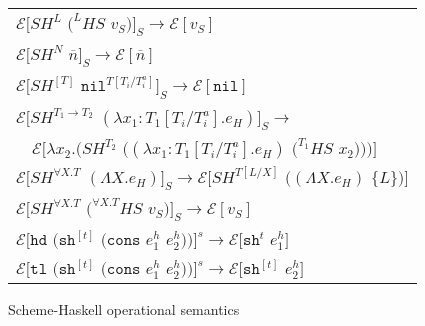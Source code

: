 \begin{figure}[p]
\centering
\begin{tabular}{l}
$\mathscr{E}[SH^{L}$ $(^{L}HS$ $v_{S})]_{S}\rightarrow\mathscr{E}[v_{S}]$ \\
$\mathscr{E}[SH^{N}$ $\overline{n}]_{S}\rightarrow\mathscr{E}[\overline{n}]$ \\
$\mathscr{E}[SH^{[T]}$ $\mathtt{nil}^{T[T_{i}/T_{i}^{a}]}]_{S}\rightarrow\mathscr{E}[\mathtt{nil}]$ \\
$\mathscr{E}[SH^{T_{1}\rightarrow T_{2}}$ $(\lambda x_{1}:T_{1}[T_{i}/T_{i}^{a}].e_{H})]_{S}\rightarrow$ \\
$\quad\mathscr{E}[\lambda x_{2}.(SH^{T_{2}}$ $((\lambda x_{1}:T_{1}[T_{i}/T_{i}^{a}].e_{H})$ $(^{T_{1}}HS$ $x_{2})))]$ \\
$\mathscr{E}[SH^{\forall X.T}$ $(\Lambda X.e_{H})]_{S}\rightarrow\mathscr{E}[SH^{T[L/X]}$ $((\Lambda X.e_{H})$ $\lbrace L\rbrace)]$ \\
$\mathscr{E}[SH^{\forall X.T}$ $(^{\forall X.T}HS$ $v_{S})]_{S}\rightarrow\mathscr{E}[v_{S}]$ \\

$\mathscr{E}[\mathtt{hd}$ $(\mathtt{sh}^{[t]}$ $(\mathtt{cons}$ $e^h_1$ $e^h_2))]^s\rightarrow\mathscr{E}[\mathtt{sh}^{t}$ $e^h_1]$ \\

$\mathscr{E}[\mathtt{tl}$ $(\mathtt{sh}^{[t]}$ $(\mathtt{cons}$ $e^h_1$ $e^h_2))]^s\rightarrow\mathscr{E}[\mathtt{sh}^{[t]}$ $e^h_2]$ \\

\end{tabular}
\caption{Scheme-Haskell operational semantics}
\label{isos}
\end{figure}